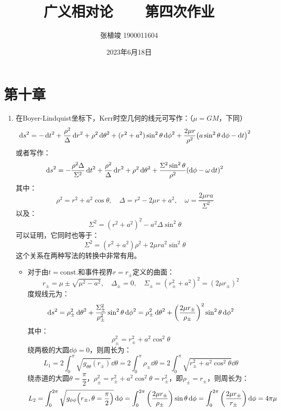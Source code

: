 \documentclass[a4paper]{article}
\title{\textbf{广义相对论\ \ \ \ 第四次作业}}
\author{张植竣 1900011604}
\date{2023年6月18日}
\begin{document}
\maketitle

\section*{第十章}

\begin{enumerate}
    \item[9.]
    在Boyer-Lindquist坐标下，Kerr时空几何的线元可写作：（$\mu = GM$，下同）
    \[
        \dd{s}^2 = -\dd{t}^2 + \frac{\rho^2}{\Delta} \dd{r}^2 + \rho^2 \dd{\theta}^2 + (r^2 + a^2)\sin^2{\theta} \dd{\phi}^2 + \frac{2\mu r}{\rho^2} \qty(a\sin^2{\theta}\dd{\phi} - \dd{t})^2
    \]
    或者写作：
    \[
        \dd{s}^2 = -\frac{\rho^2 \Delta}{\Sigma^2} \dd{t}^2 + \frac{\rho^2}{\Delta} \dd{r}^2 + \rho^2 \dd{\theta}^2 + \frac{\Sigma^2 \sin^2{\theta}}{\rho^2} \qty(\dd{\phi} - \omega \dd{t})^2
    \]
    其中：
    \[
        \rho^2 = r^2 + a^2 \cos\theta,\quad \Delta = r^2 - 2\mu r + a^2,\quad \omega = \frac{2\mu ra}{\Sigma^2}
    \]
    以及：
    \[
        \Sigma^2 = (r^2 + a^2)^2 - a^2 \Delta \sin^2{\theta}
    \]
    可以证明，它同时也等于：
    \[
        \Sigma^2 = (r^2 + a^2) \rho^2 + 2\mu r a^2 \sin^2{\theta}
    \]
    这个关系在两种写法的转换中非常有用。
    \begin{itemize}
        \item 对于由$t = \mathrm{const.}$和事件视界$r = r_\pm$定义的曲面：
        \[
            r_\pm = \mu \pm \sqrt{\mu^2 - a^2},\quad \Delta_\pm = 0,\quad \Sigma_\pm = (r_\pm^2 + a^2)^2 = (2\mu r_\pm)^2
        \]
        度规线元为：
        \[
            \dd{s}^2 = \rho_\pm^2 \dd{\theta}^2 + \frac{\Sigma_\pm^2}{\rho_\pm^2} \sin^2{\theta} \dd{\phi}^2 = \rho_\pm^2 \dd{\theta}^2 + \qty(\frac{2\mu r_\pm}{\rho_\pm})^2 \sin^2{\theta} \dd{\phi}^2
        \]
        其中：
        \[
            \rho_\pm^2 = r_\pm^2 + a^2\cos^2{\theta}
        \]
        绕两极的大圆$\dd{\phi} = 0$，则周长为：
        \[
            L_1 = 2\int_0^\pi \sqrt{g_{\theta\theta}(r_\pm)} \dd{\theta} = 2\int_0^\pi \rho_\pm \dd{\theta} = 2\int_0^\pi \sqrt{r_\pm^2 + a^2\cos^2{\theta}} \dd{\theta}
        \]
        绕赤道的大圆$\theta = \dfrac{\pi}{2}$，$\rho_\pm^2 = r_\pm^2 + a^2\cos^2{\theta} = r_\pm^2$，即$\rho_\pm = r_\pm$，则周长为：
        \[
            L_2 = \int_0^{2\pi} \sqrt{g_{\phi\phi}\qty(r_\pm, \theta=\frac{\pi}{2})} \dd{\phi} = \int_0^{2\pi} \qty(\frac{2\mu r_\pm}{\rho_\pm}) \sin{\theta} \dd{\phi} = \int_0^{2\pi} \qty(\frac{2\mu r_\pm}{r_\pm}) \dd{\phi} = 4\pi\mu
\]
\end{itemize}
\end{enumerate}
\end{document}
